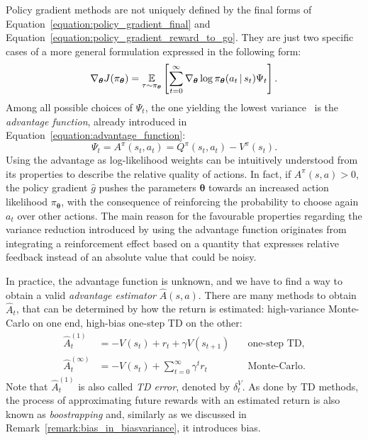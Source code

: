 Policy gradient methods are not uniquely defined by the final forms of Equation~\eqref{equation:policy_gradient_final} and Equation~\eqref{equation:policy_gradient_reward_to_go}.
They are just two specific cases of a more general formulation expressed in the following form:
%
\begin{equation*}
    \nabla_{\boldsymbol{\theta}} J(\pi_{\boldsymbol{\theta}})
    = \operatorname*{\mathbb{E}}_{\tau \sim \pi_{\boldsymbol{\theta}}} \left[ \sum_{t=0}^{\infty} \nabla_{\boldsymbol{\theta}} \log \pi_{\boldsymbol{\theta}}(a_t \operatorname{\mid} s_t) \Psi_t \right] .
\end{equation*}
%
Among all possible choices of $\Psi_t$, the one yielding the lowest variance~\parencite{schulman_high-dimensional_2018} is the \emph{advantage function}, already introduced in Equation~\eqref{equation:advantage_function}:
%
\begin{equation*}
    \Psi_t = A^\pi(s_t, a_t) = Q^\pi(s_t, a_t) - V^\pi(s_t) .
\end{equation*}
%
Using the advantage as log-likelihood weights can be intuitively understood from its properties to describe the relative quality of actions.
In fact, if $A^\pi(s, a) > 0$, the policy gradient $\hat{g}$ pushes the parameters $\boldsymbol{\theta}$ towards an increased action likelihood $\pi_{\boldsymbol{\theta}}$, with the consequence of reinforcing the probability to choose again $a_t$ over other actions.
%
The main reason for the favourable properties regarding the variance reduction introduced by using the advantage function originates from integrating a reinforcement effect based on a quantity that expresses relative feedback instead of an absolute value that could be noisy.

In practice, the advantage function is unknown, and we have to find a way to obtain a valid \emph{advantage estimator} $\hat{A}(s, a)$.
There are many methods to obtain $\hat{A}_t$, that can be determined by how the return is estimated: high-variance Monte-Carlo on one end, high-bias one-step TD on the other:
%
\begin{align*}
    \hat{A}_t^{(1)} &= -V(s_t) + r_t + \gamma V(s_{t+1}) \quad& \text{one-step TD}, \\
    \hat{A}_t^{(\infty)} &= -V(s_t) + \sum_{t=0}^{\infty} \gamma^t r_t \quad& \text{Monte-Carlo}.
\end{align*}
%
Note that $\hat{A}_t^{(1)}$ is also called \emph{TD error}, denoted by $\delta_t^V$.
As done by TD methods, the process of approximating future rewards with an estimated return is also known as \emph{boostrapping} and, similarly as we discussed in Remark~\ref{remark:bias_in_biasvariance}, it introduces bias.

